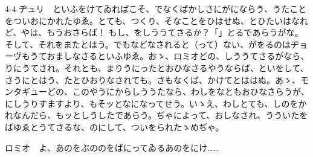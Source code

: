 \documentclass[tate,paper=b6j,jafontsize=9pt]{jlreq}
\begin{document}
\begin{azconvIndented}{4\zw}{-4\zw}
ヂュリ　といふをけてゐればこそ、でなくばかしさにがにならう、うたことをついおにかれたゆゑ。とても、つくり、そなことをひはせぬ、とひたいはなれど、やは、もうおさらば！ もし、をしううてさるか？「」とるであらうがな。そして、それをまたとはう。でもなどなされると（って）ない、がをるのはヂョーヴもうておましなさるといふゆゑ。おゝ、ロミオどの、しううてさるがなら、りにうてされ。それとも、まりうにったとおひなさるやうならば、といをして、さうにとはう、たとひおりなされても。さもなくば、かけてとははぬ。あゝ、モンタギューどの、このやうにからしううたなら、わしをなともおひなさらうが、にしうりすますより、もそッとなになってせう。いゝえ、わしとても、しのをかれなんだら、もッとしうしたであらう。ぢゃによって、おしなされ、うういたをばゆゑとうてさるな、のにして、ついをられたゝめぢゃ。

ロミオ　よ、あのをぶののをばにってゐるあのをにけ……


\end{azconvIndented}
\end{document}
